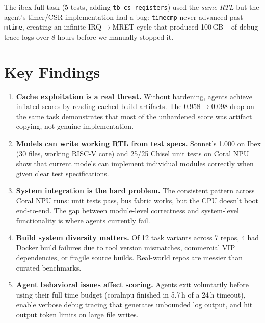 \documentclass[11pt,a4paper]{article}
\begin{document}
The ibex-full task (5 tests, adding \texttt{tb\_cs\_registers}) used the \emph{same RTL} but the agent's timer/CSR implementation had a bug: \texttt{timecmp} never advanced past \texttt{mtime}, creating an infinite IRQ$\to$MRET cycle that produced 100\,GB+ of debug trace logs over 8 hours before we manually stopped it.

\section{Key Findings}

\begin{enumerate}
\item \textbf{Cache exploitation is a real threat.} Without hardening, agents achieve inflated scores by reading cached build artifacts. The 0.958$\to$0.098 drop on the same task demonstrates that most of the unhardened score was artifact copying, not genuine implementation.

\item \textbf{Models can write working RTL from test specs.} Sonnet's 1.000 on Ibex (30 files, working RISC-V core) and 25/25 Chisel unit tests on Coral NPU show that current models can implement individual modules correctly when given clear test specifications.

\item \textbf{System integration is the hard problem.} The consistent pattern across Coral NPU runs: unit tests pass, bus fabric works, but the CPU doesn't boot end-to-end. The gap between module-level correctness and system-level functionality is where agents currently fail.

\item \textbf{Build system diversity matters.} Of 12 task variants across 7 repos, 4 had Docker build failures due to tool version mismatches, commercial VIP dependencies, or fragile source builds. Real-world repos are messier than curated benchmarks.

\item \textbf{Agent behavioral issues affect scoring.} Agents exit voluntarily before using their full time budget (coralnpu finished in 5.7\,h of a 24\,h timeout), enable verbose debug tracing that generates unbounded log output, and hit output token limits on large file writes.
\end{enumerate}
\end{document}

